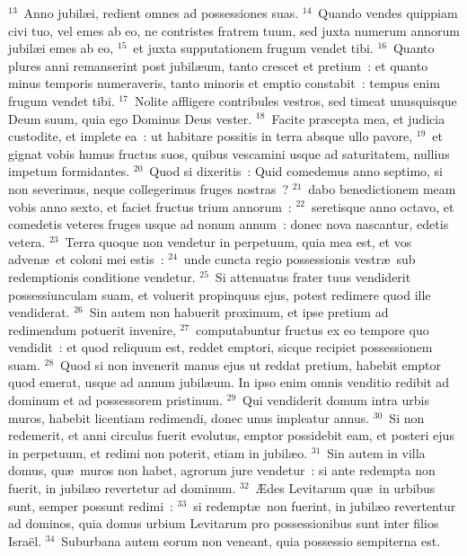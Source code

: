 ${}^{13}$~Anno jubil\ae i, redient omnes ad possessiones suas.
${}^{14}$~Quando vendes quippiam civi tuo, vel emes ab eo, ne contristes fratrem tuum, sed juxta numerum annorum jubil\ae i emes ab eo,
${}^{15}$~et juxta supputationem frugum vendet tibi.
${}^{16}$~Quanto plures anni remanserint post jubil\ae um, tanto crescet et pretium~: et quanto minus temporis numeraveris, tanto minoris et emptio constabit~: tempus enim frugum vendet tibi.
${}^{17}$~Nolite affligere contribules vestros, sed timeat unusquisque Deum suum, quia ego Dominus Deus vester.
${}^{18}$~Facite pr\ae cepta mea, et judicia custodite, et implete ea~: ut habitare possitis in terra absque ullo pavore,
${}^{19}$~et gignat vobis humus fructus suos, quibus vescamini usque ad saturitatem, nullius impetum formidantes.
${}^{20}$~Quod si dixeritis~: Quid comedemus anno septimo, si non severimus, neque collegerimus fruges nostras~?
${}^{21}$~dabo benedictionem meam vobis anno sexto, et faciet fructus trium annorum~:
${}^{22}$~seretisque anno octavo, et comedetis veteres fruges usque ad nonum annum~: donec nova nascantur, edetis vetera.
${}^{23}$~Terra quoque non vendetur in perpetuum, quia mea est, et vos adven\ae\ et coloni mei estis~:
${}^{24}$~unde cuncta regio possessionis vestr\ae\ sub redemptionis conditione vendetur.
${}^{25}$~Si attenuatus frater tuus vendiderit possessiunculam suam, et voluerit propinquus ejus, potest redimere quod ille vendiderat.
${}^{26}$~Sin autem non habuerit proximum, et ipse pretium ad redimendum potuerit invenire,
${}^{27}$~computabuntur fructus ex eo tempore quo vendidit~: et quod reliquum est, reddet emptori, sicque recipiet possessionem suam.
${}^{28}$~Quod si non invenerit manus ejus ut reddat pretium, habebit emptor quod emerat, usque ad annum jubil\ae um. In ipso enim omnis venditio redibit ad dominum et ad possessorem pristinum.
${}^{29}$~Qui vendiderit domum intra urbis muros, habebit licentiam redimendi, donec unus impleatur annus.
${}^{30}$~Si non redemerit, et anni circulus fuerit evolutus, emptor possidebit eam, et posteri ejus in perpetuum, et redimi non poterit, etiam in jubil\ae o.
${}^{31}$~Sin autem in villa domus, qu\ae\ muros non habet, agrorum jure vendetur~: si ante redempta non fuerit, in jubil\ae o revertetur ad dominum.
${}^{32}$~\AE des Levitarum qu\ae\ in urbibus sunt, semper possunt redimi~:
${}^{33}$~si redempt\ae\ non fuerint, in jubil\ae o revertentur ad dominos, quia domus urbium Levitarum pro possessionibus sunt inter filios Isra\"el.
${}^{34}$~Suburbana autem eorum non veneant, quia possessio sempiterna est.


